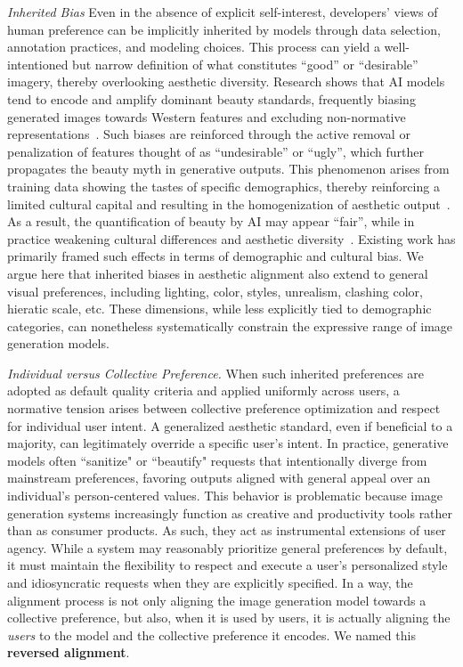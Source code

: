 \textit{Inherited Bias} 
Even in the absence of explicit self-interest, developers’ views of human preference can be implicitly inherited by models through data selection, annotation practices, and modeling choices. This process can yield a well-intentioned but narrow definition of what constitutes “good” or “desirable” imagery, thereby overlooking aesthetic diversity. Research shows that AI models tend to encode and amplify dominant beauty standards, frequently biasing generated images towards Western features and excluding non-normative representations~\cite{vargas2025visual}. Such biases are reinforced through the active removal or penalization of features thought of as ``undesirable'' or ``ugly'', which further propagates the beauty myth in generative outputs\cite{dinkar_erasing_2025}. This phenomenon arises from training data showing the tastes of specific demographics, thereby reinforcing a limited cultural capital and resulting in the homogenization of aesthetic output~\cite{vianna2025aesthetic}. As a result, the quantification of beauty by AI may appear ``fair'', while in practice weakening cultural differences and aesthetic diversity~\cite{chen2024study}. Existing work has primarily framed such effects in terms of demographic and cultural bias. We argue here that inherited biases in aesthetic alignment also extend to general visual preferences, including lighting, color, styles, unrealism, clashing color, hieratic scale, etc. These dimensions, while less explicitly tied to demographic categories, can nonetheless systematically constrain the expressive range of image generation models.

\textit{Individual versus Collective Preference.} 
\label{sec:reversed_alignment}
When such inherited preferences are adopted as default quality criteria and applied uniformly across users, a normative tension arises between collective preference optimization and respect for individual user intent. A generalized aesthetic standard, even if beneficial to a majority, can legitimately override a specific user's intent. In practice, generative models often ``sanitize" or ``beautify" requests that intentionally diverge from mainstream preferences, favoring outputs aligned with general appeal over an individual's person-centered values. This behavior is problematic because image generation systems increasingly function as creative and productivity tools rather than as consumer products. As such, they act as instrumental extensions of user agency. While a system may reasonably prioritize general preferences by default, it must maintain the flexibility to respect and execute a user's personalized style and idiosyncratic requests when they are explicitly specified. In a way, the alignment process is not only aligning the image generation model towards a collective preference, but also, when it is used by users, it is actually aligning the \emph{users} to the model and the collective preference it encodes. We named this \textbf{reversed alignment}. 


